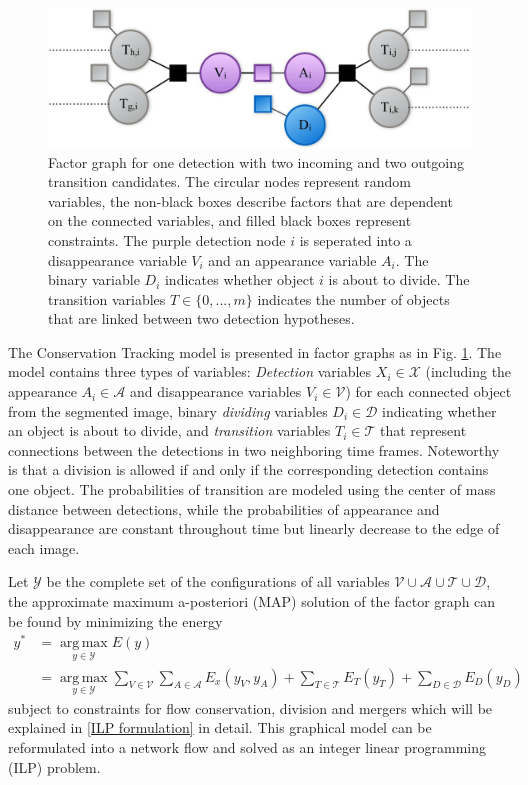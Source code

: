 \documentclass[10pt,twocolumn,letterpaper]{article}
\begin{document}
\begin{figure}[t]
  \centering
  \includegraphics[width=0.8\linewidth]{model.jpeg}
  \caption{Factor graph for one detection with two incoming and two outgoing transition candidates. The circular nodes represent random variables, the non-black boxes describe factors that are dependent on the connected variables, and filled black boxes represent constraints. The purple detection node $i$ is seperated into a disappearance variable $V_i$ and an appearance variable $A_i$. The binary variable $D_i$ indicates whether object $i$ is about to divide. The transition variables $T \in \{0,...,m\}$ indicates the number of objects that are linked between two detection hypotheses.}
  \label{fig:ctmodel}
\end{figure}

The Conservation Tracking model is presented in factor graphs as in Fig. \ref{fig:ctmodel}. The model contains three types of variables: \textit{Detection} variables $X_i \in \mathcal{X}$ (including the appearance $A_i \in \mathcal{A}$ and disappearance variables $V_i \in \mathcal{V}$) for each connected object from the segmented image, binary \textit{dividing} variables $D_i \in \mathcal{D}$ indicating whether an object is about to divide, and \textit{transition} variables $T_i \in \mathcal{T}$ that represent connections between the detections in two neighboring time frames. Noteworthy is that a division is allowed if and only if the corresponding detection contains one object. The probabilities of transition are modeled using the center of mass distance between detections, while the probabilities of appearance and disappearance are constant throughout time but linearly decrease to the edge of each image.

Let $\mathcal{Y}$ be the complete set of the configurations of all variables $\mathcal{V}\cup\mathcal{A}\cup\mathcal{T}\cup\mathcal{D}$, the approximate maximum a-posteriori (MAP) solution of the factor graph can be found by minimizing the energy
\scriptsize
\begin{equation}
\begin{split}
 y^* &= \operatorname*{arg\,max}_{y\in\mathcal{Y}} E(y) \\ 
     &= \operatorname*{arg\,max}_{y\in\mathcal{Y}} \sum\limits_{V\in\mathcal{V}}\sum\limits_{A\in\mathcal{A}} E_x(y_V, y_A) + \sum\limits_{T\in\mathcal{T}} E_T(y_T) + \sum\limits_{D\in\mathcal{D}} E_D(y_D)
\end{split}
\end{equation}
\normalsize
subject to constraints for flow conservation, division and mergers which will be explained in \ref{ILP formulation} in detail. This graphical model can be reformulated into a network flow and solved as an integer linear programming (ILP) problem.
\end{document}
